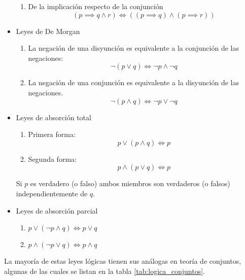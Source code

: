 \begin{itemize}
\begin{enumerate}[label=\alph*)]
		\item De la implicación respecto de la conjunción
		\[ \left( p \implies q \land r \right) \iff \left( (p \implies q) \land (p \implies r) \right) \]
	\end{enumerate}
	\item Leyes de De Morgan
	\begin{enumerate}[label=\alph*)]
		\item La negación de una disyunción es equivalente a la conjunción de las negaciones:
		\[ \neg (p \lor q) \iff \neg p \land \neg q\]
		\item La negación de  una conjunción es equivalente a la disyunción de las negaciones.
		\[ \neg (p \land q) \iff \neg p \lor \neg q \]
	\end{enumerate}
	
	\item Leyes de absorción total
	\begin{enumerate}
		\item Primera forma: \[ p \lor (p \land q) \iff p \]
		\item Segunda forma: \[ p \land (p \lor q) \iff p \]
	\end{enumerate}
	Si $p$ es verdadero (o falso) ambos miembros son verdaderos (o falsos) independientemente de $q$.
	
	\item Leyes de absorción parcial
	\begin{enumerate}
		\item \( p \lor \left(\neg p \land q\right) \iff p \lor q \)
		\item \( p \land \left(\neg p \lor q\right) \iff p \land q \)
	\end{enumerate}
\end{itemize}

La mayoría de estas leyes lógicas tienen sus análogas en teoría de conjuntos, algunas de las cuales se listan en la tabla \ref{tab:logica_conjuntos}.


